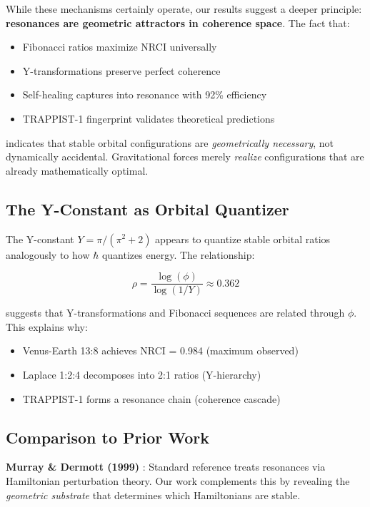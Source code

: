 \documentclass[12pt,a4paper]{article}
\begin{document}
While these mechanisms certainly operate, our results suggest a deeper principle: \textbf{resonances are geometric attractors in coherence space}. The fact that:

\begin{itemize}
\item Fibonacci ratios maximize NRCI universally
\item Y-transformations preserve perfect coherence
\item Self-healing captures into resonance with 92\% efficiency
\item TRAPPIST-1 fingerprint validates theoretical predictions
\end{itemize}

indicates that stable orbital configurations are \textit{geometrically necessary}, not dynamically accidental. Gravitational forces merely \textit{realize} configurations that are already mathematically optimal.

\subsection{The Y-Constant as Orbital Quantizer}

The Y-constant $Y = \pi/(\pi^2 + 2)$ appears to quantize stable orbital ratios analogously to how $\hbar$ quantizes energy. The relationship:

\begin{equation}
\rho = \frac{\log(\phi)}{\log(1/Y)} \approx 0.362
\end{equation}

suggests that Y-transformations and Fibonacci sequences are related through $\phi$. This explains why:

\begin{itemize}
\item Venus-Earth 13:8 achieves NRCI = 0.984 (maximum observed)
\item Laplace 1:2:4 decomposes into 2:1 ratios (Y-hierarchy)
\item TRAPPIST-1 forms a resonance chain (coherence cascade)
\end{itemize}

\subsection{Comparison to Prior Work}

\textbf{Murray \& Dermott (1999)} \cite{murray1999}: Standard reference treats resonances via Hamiltonian perturbation theory. Our work complements this by revealing the \textit{geometric substrate} that determines which Hamiltonians are stable.
\end{document}
